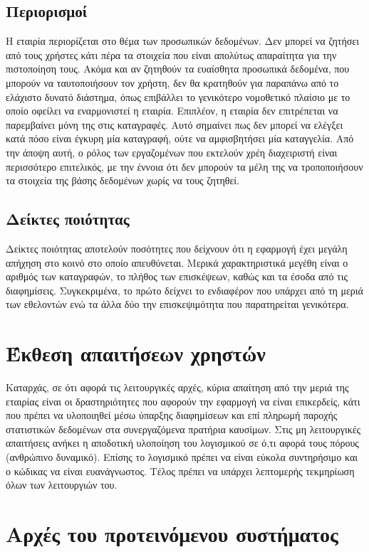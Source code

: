 \documentclass[a4paper,oneside, 12pt]{article}
\begin{document}
\subsection{Περιορισμοί}

Η εταιρία περιορίζεται στο θέμα των προσωπικών δεδομένων. Δεν μπορεί να
ζητήσει από τους χρήστες κάτι πέρα τα στοιχεία που είναι απολύτως
απαραίτητα για την πιστοποίηση τους. Ακόμα και αν ζητηθούν τα ευαίσθητα
προσωπικά δεδομένα, που μπορούν να ταυτοποιήσουν τον χρήστη, δεν θα
κρατηθούν για παραπάνω από το ελάχιστο δυνατό διάστημα, όπως επιβάλλει το
γενικότερο νομοθετικό πλαίσιο με το οποίο οφείλει να εναρμονιστεί η εταιρία.
Επιπλέον, η εταιρία δεν επιτρέπεται να παρεμβαίνει μόνη της στις καταγραφές.
Αυτό σημαίνει πως δεν μπορεί να ελέγξει κατά πόσο είναι έγκυρη μία
καταγραφή, ούτε να αμφισβητήσει μία καταγγελία. Από την άποψη αυτή, ο
ρόλος των εργαζομένων που εκτελούν χρέη διαχειριστή είναι περισσότερο
επιτελικός, με την έννοια ότι δεν μπορούν τα μέλη της να τροποποιήσουν τα
στοιχεία της βάσης δεδομένων χωρίς να τους ζητηθεί.

\subsection{Δείκτες ποιότητας}
Δείκτες ποιότητας αποτελούν ποσότητες που δείχνουν ότι η εφαρμογή έχει
μεγάλη απήχηση στο κοινό στο οποίο απευθύνεται. Μερικά χαρακτηριστικά
μεγέθη είναι ο αριθμός των καταγραφών, το πλήθος των επισκέψεων, καθώς και
τα έσοδα από τις διαφημίσεις. Συγκεκριμένα, το πρώτο δείχνει το ενδιαφέρον
που υπάρχει από τη μεριά των εθελοντών ενώ τα άλλα δύο την επισκεψιμότητα
που παρατηρείται γενικότερα.

\section{Έκθεση απαιτήσεων χρηστών}
Καταρχάς, σε ότι αφορά τις λειτουργικές αρχές, κύρια απαίτηση από την μεριά
της εταιρίας είναι οι δραστηριότητες που αφορούν την εφαρμογή να είναι
επικερδείς, κάτι που πρέπει να υλοποιηθεί μέσω ύπαρξης διαφημίσεων και επί
πληρωμή παροχής στατιστικών δεδομένων στα συνεργαζόμενα πρατήρια
καυσίμων.
Στις μη λειτουργικές απαιτήσεις ανήκει η αποδοτική υλοποίηση του λογισμικού σε
ό,τι αφορά τους πόρους (ανθρώπινο δυναμικό). Επίσης το λογισμικό πρέπει να
είναι εύκολα συντηρήσιμο και ο κώδικας να είναι ευανάγνωστος. Τέλος πρέπει
να υπάρχει λεπτομερής τεκμηρίωση όλων των λειτουργιών του.

\section{Αρχές του προτεινόμενου συστήματος}
\end{document}
